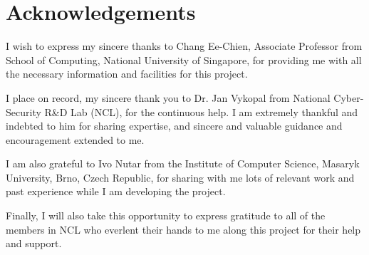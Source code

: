 \documentclass[12pt]{report}
\begin{document}
\chapter*{Acknowledgements}
\thispagestyle{empty}
\begin{spacing}{2}
\setlength{\parindent}{0pt} I wish to express my sincere thanks to Chang Ee-Chien, Associate Professor from School of
Computing, National University of Singapore, for providing me with all the necessary information and facilities for this project.

\setlength{\parindent}{0pt} I place on record, my sincere thank you to Dr. Jan Vykopal from National Cyber-Security R\&D Lab (NCL), for the continuous help. I am extremely thankful and indebted to him for sharing expertise, and sincere and valuable guidance and encouragement extended to me.

\setlength{\parindent}{0pt} I am also grateful to Ivo Nutar from the Institute of Computer Science, Masaryk University, Brno, Czech Republic, for sharing with me lots of relevant work and past experience while I am developing the project.

\setlength{\parindent}{0pt} Finally, I will also take this opportunity to express gratitude to all of the members in NCL who everlent their hands to me along this project for their help and support.
\end{spacing}
\clearpage

\tableofcontents
\end{document}
